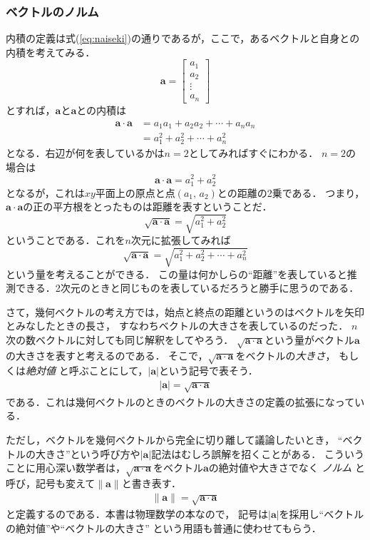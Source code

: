 \subsubsection{ベクトルのノルム}
内積の定義は式(\ref{eq:naiseki})の通りであるが，ここで，あるベクトルと自身との内積を考えてみる．
$$
\bm{a} = \left[
 \begin{array}{c}
  a_1 \\
  a_2 \\
  \vdots \\
  a_n
 \end{array}
 \right]
$$
とすれば，$\bm{a}$と$\bm{a}$との内積は
\begin{align*}
\bm{a} \cdot \bm{a} & =  a_1 a_1 + a_2 a_2 + \cdots + a_n a_n \\
& = a_1^2+a_2^2+\cdots+a_n^2
\end{align*}
となる．右辺が何を表しているかは$n=2$としてみればすぐにわかる．
$n=2$の場合は
$$
\bm{a} \cdot \bm{a} = a_1^2 + a_2^2
$$
となるが，これは$xy$平面上の原点と点$(a_1, \, a_2)$との距離の2乗である．
つまり，$\bm{a} \cdot \bm{a}$の正の平方根をとったものは距離を表すということだ．
$$
\sqrt{\bm{a}\cdot\bm{a}} = \sqrt{a_1^2 + a_2^2} 
$$
ということである．これを$n$次元に拡張してみれば
$$
\sqrt{\bm{a}\cdot\bm{a}} = \sqrt{a_1^2 + a_2^2+\cdots + a_n^2}
$$
という量を考えることができる．
この量は何かしらの``距離''を表していると推測できる．2次元のときと同じものを表しているだろうと勝手に思うのである．

さて，幾何ベクトルの考え方では，始点と終点の距離というのはベクトルを矢印とみなしたときの長さ，
すなわちベクトルの大きさを表しているのだった．
$n$次の数ベクトルに対しても同じ解釈をしてやろう．
$\sqrt{\bm{a}\cdot\bm{a}}$という量がベクトル$\bm{a}$の大きさを表すと考えるのである．
そこで，$\sqrt{\bm{a}\cdot\bm{a}}$をベクトルの\emph{大きさ}，
もしくは\emph{絶対値}
と呼ぶことにして，$\lvert \bm{a} \rvert$という記号で表そう．
\begin{align}
\lvert \bm{a} \rvert = \sqrt{\bm{a}\cdot\bm{a}}
\label{eq:vecabs}
\end{align}
である．これは幾何ベクトルのときのベクトルの大きさの定義の拡張になっている．

ただし，ベクトルを幾何ベクトルから完全に切り離して議論したいとき，
``ベクトルの大きさ''という呼び方や$\lvert \bm{a} \rvert$記法はむしろ誤解を招くことがある．
こういうことに用心深い数学者は，$\sqrt{\bm{a}\cdot\bm{a}}$をベクトル$\bm{a}$の絶対値や大きさでなく
\emph{ノルム}
と呼び，記号も変えて$\| \bm{a} \|$と書き表す．
\begin{align}
\| \bm{a} \| = \sqrt{\bm{a}\cdot\bm{a}}
\label{eq:norm}
\end{align}
と定義するのである．本書は物理数学の本なので，
記号は$\lvert \bm{a} \rvert$を採用し``ベクトルの絶対値''や``ベクトルの大きさ''
という用語も普通に使わせてもらう．

